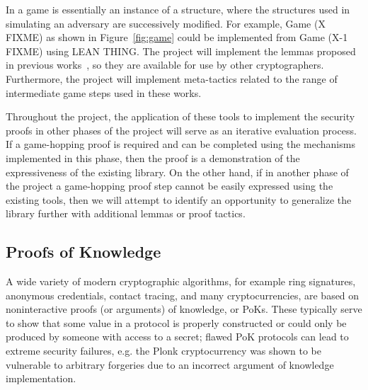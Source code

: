 In \vcvio a game is essentially an instance of a  structure, where the  structures used in simulating an adversary are successively modified.
For example, Game (X FIXME) as shown in Figure~\ref{fig:game} could be implemented from Game (X-1 FIXME) using LEAN THING.
The project will implement the lemmas proposed in previous works~\cite{bellare2006security,shoup2004sequences,halevi2005plausible}, so they are available for use by other cryptographers.
Furthermore, the project will implement meta-tactics related to the range of intermediate game steps used in these works.

Throughout the project, the application of these tools to implement the security proofs in other phases of the project will serve as an iterative evaluation process.
If a game-hopping proof is required and can be completed using the mechanisms implemented in this phase, then the proof is a demonstration of the expressiveness of the existing library.
On the other hand, if in another phase of the project a game-hopping proof step cannot be easily expressed using the existing tools, then we will attempt to identify an opportunity to generalize the library further with additional lemmas or proof tactics.

\subsection{Proofs of Knowledge} \label{sec:pok}

A wide variety of modern cryptographic algorithms, for example ring signatures, anonymous credentials, contact tracing, and many cryptocurrencies, are based on noninteractive proofs (or arguments) of knowledge, or PoKs.  These typically serve to show that some value in a protocol is properly constructed or could only be produced by someone with access to a secret; flawed PoK protocols can lead to extreme security failures, e.g. the Plonk cryptocurrency was shown to be vulnerable to arbitrary forgeries due to an incorrect argument of knowledge implementation.

